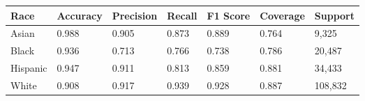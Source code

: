 \begin{tabular}{lllllll}
\toprule
Race & Accuracy & Precision & Recall & F1 Score & Coverage & Support \\
\midrule
Asian & 0.988 & 0.905 & 0.873 & 0.889 & 0.764 & 9,325 \\
Black & 0.936 & 0.713 & 0.766 & 0.738 & 0.786 & 20,487 \\
Hispanic & 0.947 & 0.911 & 0.813 & 0.859 & 0.881 & 34,433 \\
White & 0.908 & 0.917 & 0.939 & 0.928 & 0.887 & 108,832 \\
\bottomrule
\end{tabular}
